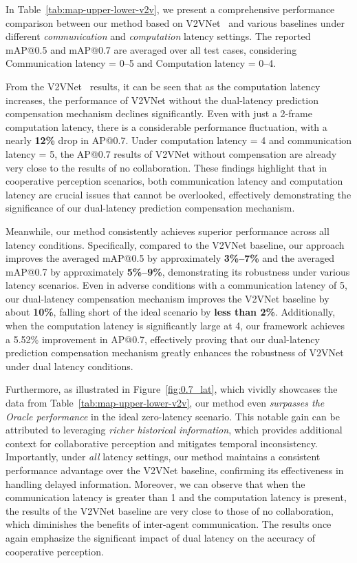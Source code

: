 In Table~\ref{tab:map-upper-lower-v2v}, we present a comprehensive performance comparison between our method based on V2VNet~\cite{wang2020v2vnet} and various baselines under different \emph{communication} and \emph{computation} latency settings. The reported mAP@0.5 and mAP@0.7 are averaged over all test cases, considering Communication latency = 0--5 and Computation latency = 0--4.

From the V2VNet~\cite{wang2020v2vnet} results, it can be seen that as the computation latency increases, the performance of V2VNet without the dual-latency prediction compensation mechanism declines significantly. Even with just a 2-frame computation latency, there is a considerable performance fluctuation, with a nearly \textbf{12\%} drop in AP@0.7. Under computation latency = 4 and communication latency = 5, the AP@0.7 results of V2VNet without compensation are already very close to the results of no collaboration. These findings highlight that in cooperative perception scenarios, both communication latency and computation latency are crucial issues that cannot be overlooked, effectively demonstrating the significance of our dual-latency prediction compensation mechanism.

Meanwhile, our method consistently achieves superior performance across all latency conditions. Specifically, compared to the V2VNet baseline, our approach improves the averaged mAP@0.5 by approximately \textbf{3\%--7\%} and the averaged mAP@0.7 by approximately \textbf{5\%--9\%}, demonstrating its robustness under various latency scenarios. Even in adverse conditions with a communication latency of 5, our dual-latency compensation mechanism improves the V2VNet baseline by about \textbf{10\%}, falling short of the ideal scenario by \textbf{less than 2\%}. Additionally, when the computation latency is significantly large at 4, our framework achieves a 5.52\% improvement in AP@0.7, effectively proving that our dual-latency prediction compensation mechanism greatly enhances the robustness of V2VNet under dual latency conditions.


Furthermore, as illustrated in Figure~\ref{fig:0.7_lat}, which vividly showcases the data from Table~\ref{tab:map-upper-lower-v2v}, our method even \emph{surpasses the Oracle performance} in the ideal zero-latency scenario. This notable gain can be attributed to leveraging \emph{richer historical information}, which provides additional context for collaborative perception and mitigates temporal inconsistency. Importantly, under \emph{all} latency settings, our method maintains a consistent performance advantage over the V2VNet baseline, confirming its effectiveness in handling delayed information. Moreover, we can observe that when the communication latency is greater than 1 and the computation latency is present, the results of the V2VNet baseline are very close to those of no collaboration, which diminishes the benefits of inter-agent communication. The results once again emphasize the significant impact of dual latency on the accuracy of cooperative perception.


